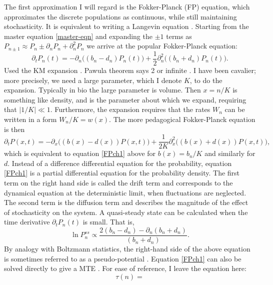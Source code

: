 The first approximation I will regard is the Fokker-Planck (FP) equation, which approximates the discrete populations as continuous, while still maintaining stochasticity. It is equivalent to writing a Langevin equation \cite{Gardiner2004?}. %
Starting from the master equation \ref{master-eqn} and expanding the $\pm 1$ terms as $P_{n\pm 1} \approx P_n \pm \partial_n P_n + \partial^2_n P_n$ we arrive at the popular Fokker-Planck equation:
\begin{equation}
\partial_t P_n(t) = - \partial_n\big( (b_n - d_n) P_n(t) \big) + \frac{1}{2} \partial_n^2 \Big( (b_n + d_n) P_n(t) \Big). \label{FPch1}
\end{equation}
Used the KM expansion \cite{Gardiner2004}. Pawula theorem says 2 or infinite \cite{Risken}. %
I have been cavalier; more precisely, we need a large parameter, which I denote $K$, to do the expansion. Typically in bio the large parameter is volume. Then $x=n/K$ is something like density, and is the parameter about which we expand, requiring that $|1/K| \ll 1$. 
Furthermore, the expansion requires that the rates $W_n$ can be written in a form $W_n/K = w(x)$. %
The more pedagogical Fokker-Planck equation is then
\begin{equation}
\partial_t P(x,t) = - \partial_x\big( (b(x) - d(x)) P(x,t) \big) + \frac{1}{2 K} \partial_x^2 \Big( (b(x) + d(x)) P(x,t) \Big),
\end{equation}
which is equivalent to equation \ref{FPch1} above for $b(x) = b_n/K$ and similarly for $d$. 
Instead of a difference differential equation for the probability, equation \ref{FPch1} is a partial differential equation for the probability density. %
The first term on the right hand side is called the drift term and corresponds to the dynamical equation at the deterministic limit, when fluctuations are neglected. 
The second term is the diffusion term and describes the magnitude of the effect of stochasticity on the system. 
A quasi-steady state can be calculated when the time derivative $\partial_t P_n(t)$ is small. 
That is,
\begin{equation}
\ln P_n^{ss} \propto \frac{2(b_n - d_n) - \partial_n(b_n + d_n)}{(b_n + d_n)}. 
\end{equation}
By analogy with Boltzmann statistics, the right-hand side of the above equation is sometimes referred to as a pseudo-potential \cite{Zhou-ish}. 
Equation \ref{FPch1} can also be solved directly to give a MTE \cite{Gardiner2004}. 
For ease of reference, I leave the equation here:
\begin{equation}
\tau(n) = %
\end{equation}

